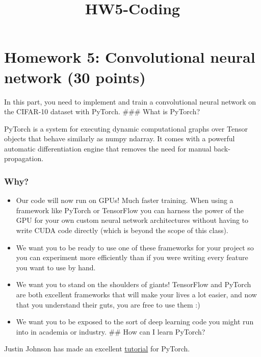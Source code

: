 \documentclass[11pt]{article}
\title{HW5-Coding}
\providecommand{\tightlist}{%
      \setlength{\itemsep}{0pt}\setlength{\parskip}{0pt}}
\begin{document}
    
    \maketitle
    
    

    
    \hypertarget{homework-5-convolutional-neural-network-30-points}{%
\section{Homework 5: Convolutional neural network (30
points)}\label{homework-5-convolutional-neural-network-30-points}}

    In this part, you need to implement and train a convolutional neural
network on the CIFAR-10 dataset with PyTorch. \#\#\# What is PyTorch?

PyTorch is a system for executing dynamic computational graphs over
Tensor objects that behave similarly as numpy ndarray. It comes with a
powerful automatic differentiation engine that removes the need for
manual back-propagation.

\hypertarget{why}{%
\subsubsection{Why?}\label{why}}

\begin{itemize}
\tightlist
\item
  Our code will now run on GPUs! Much faster training. When using a
  framework like PyTorch or TensorFlow you can harness the power of the
  GPU for your own custom neural network architectures without having to
  write CUDA code directly (which is beyond the scope of this class).
\item
  We want you to be ready to use one of these frameworks for your
  project so you can experiment more efficiently than if you were
  writing every feature you want to use by hand.
\item
  We want you to stand on the shoulders of giants! TensorFlow and
  PyTorch are both excellent frameworks that will make your lives a lot
  easier, and now that you understand their guts, you are free to use
  them :)
\item
  We want you to be exposed to the sort of deep learning code you might
  run into in academia or industry. \#\# How can I learn PyTorch?
\end{itemize}

Justin Johnson has made an excellent
\href{https://github.com/jcjohnson/pytorch-examples}{tutorial} for
PyTorch.
\end{document}
